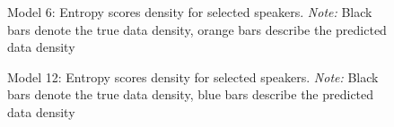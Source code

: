 \documentclass[
  authoryear,
  preprint,
  1p]{elsarticle}
\begin{document}
\label{cell-fig-rq3-pred-speaker_model06}
\begin{figure}[H]


\caption{\label{fig-rq3-pred-speaker_model06}Model 6: Entropy scores
density for selected speakers. \emph{Note:} Black bars denote the true
data density, orange bars describe the predicted data density}

\end{figure}%

\label{cell-fig-rq3-pred-speaker_model12}
\begin{figure}[H]


\caption{\label{fig-rq3-pred-speaker_model12}Model 12: Entropy scores
density for selected speakers. \emph{Note:} Black bars denote the true
data density, blue bars describe the predicted data density}

\end{figure}%
\end{document}
